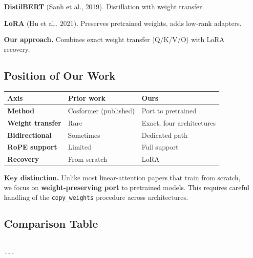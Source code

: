 \textbf{DistilBERT} (Sanh et al., 2019). Distillation with weight transfer.

\textbf{LoRA} (Hu et al., 2021). Preserves pretrained weights, adds low-rank 
adapters.

\textbf{Our approach.} Combines exact weight transfer (Q/K/V/O) with LoRA recovery.

\subsection{Position of Our Work}

\begin{table}[H]
\centering
\small
\begin{tabular}{lll}
\toprule
\textbf{Axis} & \textbf{Prior work} & \textbf{Ours} \\
\midrule
\textbf{Method} & Cosformer (published) & Port to pretrained \\
\textbf{Weight transfer} & Rare & Exact, four architectures \\
\textbf{Bidirectional} & Sometimes & Dedicated path \\
\textbf{RoPE support} & Limited & Full support \\
\textbf{Recovery} & From scratch & LoRA \\
\bottomrule
\end{tabular}
\end{table}

\textbf{Key distinction.} Unlike most linear-attention papers that train from 
scratch, we focus on \textbf{weight-preserving port} to pretrained models. This 
requires careful handling of the \texttt{copy\_weights} procedure across 
architectures.



\subsection{Comparison Table}

\begin{lstlisting}

---
\end{lstlisting}